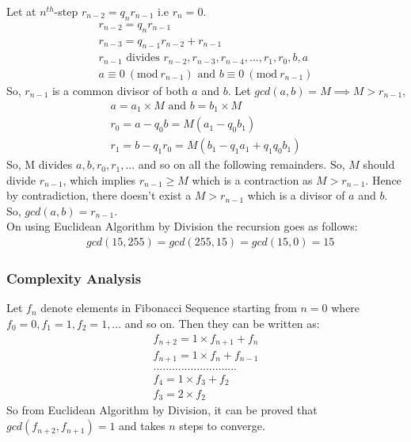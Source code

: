 \documentclass[journal,12pt,twocolumn]{IEEEtran}
\begin{document}
Let at $n^{th}$-step $r_{n-2} = q_{n}r_{n-1}$ i.e $r_{n} = 0$.
 \begin{align}
    r_{n-2} = q_{n}r_{n-1}\\
    r_{n-3} = q_{n-1}r_{n-2} + r_{n-1}\\
    r_{n-1} \text{ divides } r_{n-2}, r_{n-3}, r_{n-4},..., r_{1}, r_{0}, b, a\\
    a \equiv 0\ (\textrm{mod}\ r_{n-1}) \text{ and } b \equiv 0\ (\textrm{mod}\ r_{n-1})
\end{align}
So, $r_{n-1}$ is a common divisor of both $a$ and $b$. Let $gcd(a,b) = M \implies M > r_{n-1}$,\\
\begin{align}
    a = a_{1} \times M \text{ and } b = b_{1} \times M\\
    r_{0} = a - q_{0}b = M(a_{1} - q_{0}b_{1})\\
    r_{1} = b - q_{1}r_{0} = M(b_{1} - q_{1}a_{1} + q_{1}q_{0}b_{1})
\end{align}
So, M divides $a, b, r_{0}, r_{1}, ... $ and so on all the following remainders. So, $M$ should divide $r_{n-1}$, which implies $r_{n-1} \geq M$ which is a contraction as $M > r_{n-1}$. Hence by contradiction, there doesn't exist a $M > r_{n-1}$ which is a divisor of $a$ and $b$. So, $gcd(a,b) = r_{n-1}$.\\

\quad On using Euclidean Algorithm by Division the recursion goes as follows:
\[
\begin{split}
&gcd(15,255) = gcd(255,15) = gcd(15,0) = 15
\end{split}\]

\subsubsection{Complexity Analysis}
Let $f_{n}$ denote elements in Fibonacci Sequence starting from $n=0$ where $f_{0} = 0, f_{1} = 1, f_{2} = 1,...$ and so on. Then they can be written as:
\begin{align*}
f_{n+2} = 1 \times f_{n+1} + f_{n}\\
f_{n+1} = 1 \times f_{n} + f_{n-1}\\
...........................\\
f_{4} = 1 \times f_{3} + f_{2}\\
f_{3} = 2 \times f_{2}
\end{align*}
So from Euclidean Algorithm by Division, it can be proved that $gcd(f_{n+2}, f_{n+1}) = 1$ and takes $n$ steps to converge.\\
\end{document}
